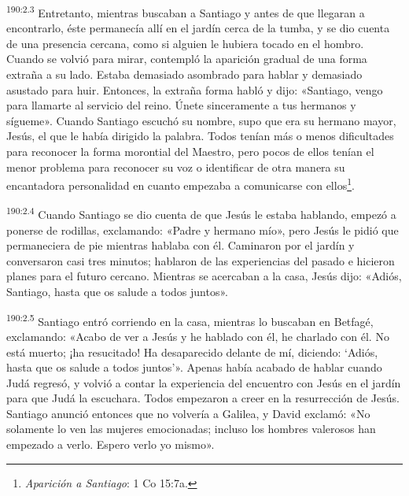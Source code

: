 \par
\textsuperscript{190:2.3} Entretanto, mientras buscaban a Santiago y antes de que llegaran a encontrarlo, éste permanecía allí en el jardín cerca de la tumba, y se dio cuenta de una presencia cercana, como si alguien le hubiera tocado en el hombro. Cuando se volvió para mirar, contempló la aparición gradual de una forma extraña a su lado. Estaba demasiado asombrado para hablar y demasiado asustado para huir. Entonces, la extraña forma habló y dijo: «Santiago, vengo para llamarte al servicio del reino. Únete sinceramente a tus hermanos y sígueme». Cuando Santiago escuchó su nombre, supo que era su hermano mayor, Jesús, el que le había dirigido la palabra. Todos tenían más o menos dificultades para reconocer la forma morontial del Maestro, pero pocos de ellos tenían el menor problema para reconocer su voz o identificar de otra manera su encantadora personalidad en cuanto empezaba a comunicarse con ellos\footnote{\textit{Aparición a Santiago}: 1 Co 15:7a.}.

\par
\textsuperscript{190:2.4} Cuando Santiago se dio cuenta de que Jesús le estaba hablando, empezó a ponerse de rodillas, exclamando: «Padre y hermano mío», pero Jesús le pidió que permaneciera de pie mientras hablaba con él. Caminaron por el jardín y conversaron casi tres minutos; hablaron de las experiencias del pasado e hicieron planes para el futuro cercano. Mientras se acercaban a la casa, Jesús dijo: «Adiós, Santiago, hasta que os salude a todos juntos».

\par
\textsuperscript{190:2.5} Santiago entró corriendo en la casa, mientras lo buscaban en Betfagé, exclamando: «Acabo de ver a Jesús y he hablado con él, he charlado con él. No está muerto; ¡ha resucitado! Ha desaparecido delante de mí, diciendo: `Adiós, hasta que os salude a todos juntos'». Apenas había acabado de hablar cuando Judá regresó, y volvió a contar la experiencia del encuentro con Jesús en el jardín para que Judá la escuchara. Todos empezaron a creer en la resurrección de Jesús. Santiago anunció entonces que no volvería a Galilea, y David exclamó: «No solamente lo ven las mujeres emocionadas; incluso los hombres valerosos han empezado a verlo. Espero verlo yo mismo».

